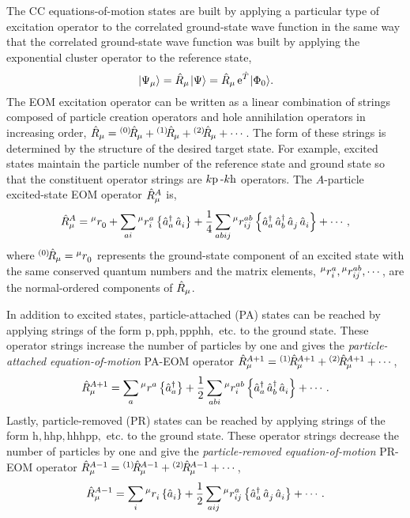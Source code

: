 \documentclass[thesis.tex]{subfiles}
\begin{document}
The CC equations-of-motion states are built by applying a particular type of excitation operator to the correlated ground-state wave function in the same way that the correlated ground-state wave function was built by applying the exponential cluster operator to the reference state,
\begin{equation}\label{eq:eom_def}
  \hspace{1pt}\lvert \Psi_{\mu} \rangle = \hat{R}\hspace{-0.1pt}_{\mu}\hspace{1pt}\lvert \Psi \rangle = \hat{R}\hspace{-0.1pt}_{\mu}\operatorname{e}^{\hat{T}\hspace{-0.25pt}}\hspace{1pt}\lvert \Phi_{0} \rangle.
\end{equation}
The EOM excitation operator can be written as a linear combination of strings composed of particle creation operators and hole annihilation operators in increasing order, $\hat{R}\hspace{-0.1pt}_{\mu} = {}^{\left(0\right)}\hspace{-2pt}\hat{R}\hspace{-0.5pt}_{\mu} + {}^{\left(1\right)}\hspace{-2pt}\hat{R}\hspace{-0.5pt}_{\mu} + {}^{\left(2\right)}\hspace{-2pt}\hat{R}\hspace{-0.5pt}_{\mu} + \cdots$.  The form of these strings is determined by the structure of the desired target state.  For example, excited states maintain the particle number of the reference state and ground state so that the constituent operator strings are $k\mathrm{p}\hspace{2pt}\text{-}k\mathrm{h}$ operators.  The $A$-particle excited-state EOM operator $\hat{R}\hspace{-0.1pt}^{A}_{\mu}$ is,
\begin{equation}
  \hat{R}\hspace{-0.1pt}^{A}_{\mu} = {}^{\mu}r^{}_{0} + \sum_{ai}{}^{\mu}r^{a}_{i}\left\{\mathop{\hat{a}^{\dagger}_{a}}\mathop{\hat{a}^{}_{i}}\right\} + \frac{1}{4}\sum_{abij}{}^{\mu}r^{ab}_{ij}\left\{\mathop{\hat{a}^{\dagger}_{a}}\mathop{\hat{a}^{\dagger}_{b}}\mathop{\hat{a}^{}_{j}}\mathop{\hat{a}^{}_{i}}\right\} + \cdots,
\end{equation}
where ${}^{\left(0\right)}\hspace{-2pt}\hat{R}\hspace{-0.5pt}_{\mu} = {}^{\mu}r^{}_{0}$ represents the ground-state component of an excited state with the same conserved quantum numbers and the matrix elements, ${}^{\mu}r^{a}_{i}, {}^{\mu}r^{ab}_{ij}, \cdots$, are the normal-ordered components of $\hat{R}\hspace{-0.1pt}_{\mu}$.

In addition to excited states, particle-attached (PA) states can be reached by applying strings of the form $\mathrm{p,pph,ppphh,}$ etc. to the ground state.  These operator strings increase the number of particles by one and gives the \textit{particle-attached equation-of-motion} PA-EOM operator $\hat{R}\hspace{-0.1pt}^{A+1}_{\mu} = {}^{\left(1\right)}\hspace{-2pt}\hat{R}\hspace{-0.5pt}^{A+1}_{\mu} + {}^{\left(2\right)}\hspace{-2pt}\hat{R}\hspace{-0.5pt}^{A+1}_{\mu} + \cdots $,
\begin{equation} \label{eq:pa_right}
  \hat{R}\hspace{-0.1pt}^{A+1}_{\mu} = \sum_{a}{}^{\mu}r^{a}_{}\left\{\mathop{\hat{a}^{\dagger}_{a}}\right\} + \frac{1}{2}\sum_{abi}{}^{\mu}r^{ab}_{i}\left\{\mathop{\hat{a}^{\dagger}_{a}}\mathop{\hat{a}^{\dagger}_{b}}\mathop{\hat{a}^{}_{i}}\right\} + \cdots.
\end{equation}
Lastly, particle-removed (PR) states can be reached by applying strings of the form $\mathrm{h,hhp,hhhpp,}$ etc. to the ground state.  These operator strings decrease the number of particles by one and give the \textit{particle-removed equation-of-motion} PR-EOM operator $\hat{R}\hspace{-0.1pt}^{A-1}_{\mu} = {}^{\left(1\right)}\hspace{-2pt}\hat{R}\hspace{-0.5pt}^{A-1}_{\mu} + {}^{\left(2\right)}\hspace{-2pt}\hat{R}\hspace{-0.5pt}^{A-1}_{\mu} + \cdots $,
\begin{equation} \label{eq:pr_right}
  \hat{R}\hspace{-0.1pt}^{A-1}_{\mu} = \sum_{i}{}^{\mu}r^{}_{i}\left\{\mathop{\hat{a}^{}_{i}}\right\} + \frac{1}{2}\sum_{aij}{}^{\mu}r^{a}_{ij}\left\{\mathop{\hat{a}^{\dagger}_{a}}\mathop{\hat{a}^{}_{j}}\mathop{\hat{a}^{}_{i}}\right\} + \cdots.
\end{equation}
\end{document}
